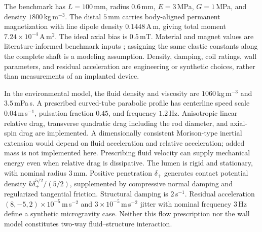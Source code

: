 The benchmark has $L=100$\,mm, radius $0.6$\,mm, $E=3$\,MPa, $G=1$\,MPa, and density $1800$\,kg\,m$^{-3}$. The distal $5$\,mm carries body-aligned permanent magnetization with line dipole density $0.1448$\,A\,m, giving total moment $7.24\times10^{-4}$\,A\,m$^2$. The ideal axial bias is $0.5$\,mT. Material and magnet values are literature-informed benchmark inputs \citep{Tong2025}; assigning the same elastic constants along the complete shaft is a modeling assumption. Density, damping, coil ratings, wall parameters, and residual acceleration are engineering or synthetic choices, rather than measurements of an implanted device.

In the environmental model, the fluid density and viscosity are $1060$\,kg\,m$^{-3}$ and $3.5$\,mPa\,s. A prescribed curved-tube parabolic profile has centerline speed scale $0.04$\,m\,s$^{-1}$, pulsation fraction $0.45$, and frequency $1.2$\,Hz. Anisotropic linear relative drag, transverse quadratic drag including the rod diameter, and axial-spin drag are implemented. A dimensionally consistent Morison-type inertial extension would depend on fluid acceleration and relative acceleration; added mass is not implemented here. Prescribing fluid velocity can supply mechanical energy even when relative drag is dissipative. The lumen is rigid and stationary, with nominal radius $3$\,mm. Positive penetration $\delta_+$ generates contact potential density $k\delta_+^{5/2}/(5/2)$, supplemented by compressive normal damping and regularized tangential friction. Structural damping is $2$\,s$^{-1}$. Residual acceleration $(8,-5,2)\times10^{-5}$\,m\,s$^{-2}$ and $3\times10^{-5}$\,m\,s$^{-2}$ jitter with nominal frequency $3$\,Hz define a synthetic microgravity case. Neither this flow prescription nor the wall model constitutes two-way fluid--structure interaction.

